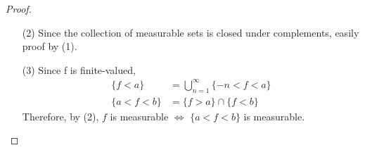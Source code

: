 \begin{defn}
\begin{rmk}
\begin{itemize}
\begin{proof}
\begin{enumerate}
						\item[(2)]Since the collection of measurable sets is closed under complements, easily proof by (1).
						
						\item[(3)]Since f is finite-valued,
						\begin{align}
							\{ f < a \} &= \bigcup_{n = 1}^{\infty}{\{ -n < f < a \}} \\
							\{ a < f < b \} &= \{ f > a \} \cap \{ f < b \}
						\end{align}
						Therefore, by (2), $f$ is measurable $\Leftrightarrow$ $\{ a < f < b \}$ is measurable.
					\end{enumerate}
				\end{proof}
			\end{itemize}
		\end{rmk}
	\end{defn}

\vspace{2em}
